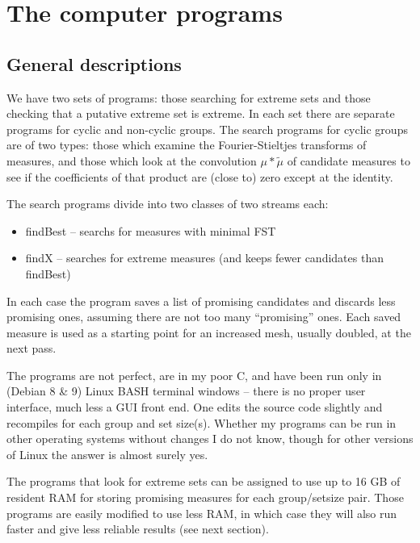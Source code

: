\documentclass[letter,11pt]{amsart}
\numberwithin{theorem}{section}
\theoremstyle{remark}
\numberwithin{equation}{section}
\begin{document}
\section{The computer programs}\label{secComputer} 
\subsection{General descriptions}
We have two sets of programs: those  searching for extreme sets and those  checking
that a putative extreme set is  ex\-treme. In each set there are 
separate programs for cyclic
and non-cyc\-lic groups. The search programs for cyclic groups are of two types: those which examine the Fourier-Stieltjes transforms
of measures, and those which look at the convolution $\mu*\widetilde\mu$ of candidate measures to see
if the coefficients of that product are (close to) zero except at the identity.

The search programs divide into two classes of two streams each:
\begin{itemize}
\item findBest -- searchs for measures with minimal FST
\item findX -- searches for extreme measures (and keeps fewer candidates than findBest)
\end{itemize}
In each case
the program saves a list of promising candidates and discards less promising ones, assuming
there are not too many ``promising'' ones. Each saved
measure is used as a starting point for  an increased mesh, usually doubled, at the next pass.\


The programs are not perfect, are in my poor C, and have been run
only in  (Debian 8 \& 9) Linux  BASH terminal windows --
 there is no proper user interface, much less a GUI front end. 
One edits the source code slightly and recompiles for each group and set size(s). Whether my programs
 can be run
 in other operating systems without changes I do not know, though
  for other versions of Linux the answer is almost surely yes.
  
  The programs that look for extreme sets can be assigned to use up to 16 GB of resident RAM for
  storing promising measures for each group/setsize pair. Those programs are easily modified to 
  use less RAM, in which case they 
  will also run faster and give   less reliable results (see next section). 
  
\end{document}
